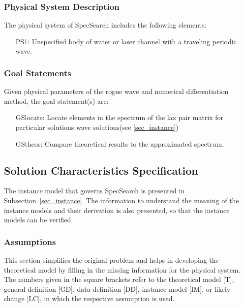 \documentclass[12pt]{article}
\begin{document}
\subsubsection{Physical System Description}

The physical system of SpecSearch includes the following elements:

\begin{itemize}

\item[PS1:] 
Unspecified body of water or laser channel with a traveling periodic 
wave.

\end{itemize}

\subsubsection{Goal Statements}

\noindent Given physical parameters of the rogue wave and numerical 
differentiation method, the goal 
statement(s) are:

\begin{itemize}[leftmargin=.75in]

\item[GSlocate:] {Locate elements in the spectrum of the lax pair matrix for 
particular solutions wave solutions(see 
\ref{sec_instance}) }
\item[GStheor:] {Compare theoretical results to the approximated spectrum.}

\end{itemize}

\subsection{Solution Characteristics Specification}

The instance model that governs SpecSearch is presented in
Subsection~\ref{sec_instance}.  The information to understand the meaning of the
instance models and their derivation is also presented, so that the instance
models can be verified.

\subsubsection{Assumptions}

This section simplifies the original problem and helps in developing the
theoretical model by filling in the missing information for the physical
system. The numbers given in the square brackets refer to the theoretical model
[T], general definition [GD], data definition [DD], instance model [IM], or
likely change [LC], in which the respective assumption is used.
\end{document}
